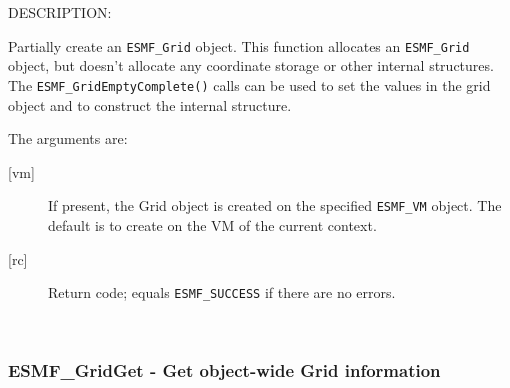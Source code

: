 {\sf DESCRIPTION:\\ }


   Partially create an {\tt ESMF\_Grid} object. This function allocates
   an {\tt ESMF\_Grid} object, but doesn't allocate any coordinate storage or other
   internal structures. The {\tt ESMF\_GridEmptyComplete()} calls
   can be used to set the values in the grid object and to construct the
   internal structure.
  
   The arguments are:
   \begin{description}
   \item[{[vm]}]
       If present, the Grid object is created on the specified
       {\tt ESMF\_VM} object. The default is to create on the VM of the
       current context.
   \item[{[rc]}]
        Return code; equals {\tt ESMF\_SUCCESS} if there are no errors.
   \end{description}
   
 
\mbox{}\hrulefill\ 
 

  \label{API:GridGet}\subsubsection [ESMF\_GridGet] {ESMF\_GridGet - Get object-wide Grid information}


